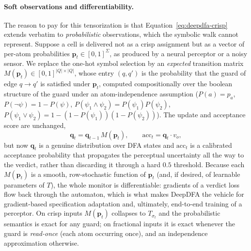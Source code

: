 \paragraph{Soft observations and differentiability.}
The reason to pay for this tensorization is that Equation~\eqref{eq:deepdfa-crisp} extends verbatim to \emph{probabilistic} observations, which the symbolic walk cannot represent. Suppose a cell is delivered not as a crisp assignment but as a vector of per-atom probabilities $\mathbf{p}_t \in [0,1]^{\Sigma}$, as produced by a neural perceptor or a noisy sensor. We replace the one-hot symbol selection by an \emph{expected} transition matrix $M(\mathbf{p}_t) \in [0,1]^{|Q| \times |Q|}$, whose entry $(q, q')$ is the probability that the guard of edge $q \to q'$ is satisfied under $\mathbf{p}_t$, computed compositionally over the boolean structure of the guard under an atom-independence assumption ($P(a) = p_a$, $P(\lnot \psi) = 1 - P(\psi)$, $P(\psi_1 \land \psi_2) = P(\psi_1)P(\psi_2)$, $P(\psi_1 \lor \psi_2) = 1 - (1 - P(\psi_1))(1 - P(\psi_2))$). The update and acceptance score are unchanged,
\begin{equation}
  \mathbf{q}_t = \mathbf{q}_{t-1}\, M(\mathbf{p}_t),
  \qquad
  \mathrm{acc}_t = \mathbf{q}_t \cdot v_o,
  \label{eq:deepdfa-soft}
\end{equation}
but now $\mathbf{q}_t$ is a genuine distribution over DFA states and $\mathrm{acc}_t$ is a calibrated acceptance probability that propagates the perceptual uncertainty all the way to the verdict, rather than discarding it through a hard $0.5$ threshold. Because each $M(\mathbf{p}_t)$ is a smooth, row-stochastic function of $\mathbf{p}_t$ (and, if desired, of learnable parameters of $T$), the whole monitor is differentiable: gradients of a verdict loss flow back through the automaton, which is what makes DeepDFA the vehicle for gradient-based specification adaptation and, ultimately, end-to-end training of a perceptor. On crisp inputs $M(\mathbf{p}_t)$ collapses to $T_{\sigma_t}$ and the probabilistic semantics is exact for any guard; on fractional inputs it is exact whenever the guard is \emph{read-once} (each atom occurring once), and an independence approximation otherwise.

